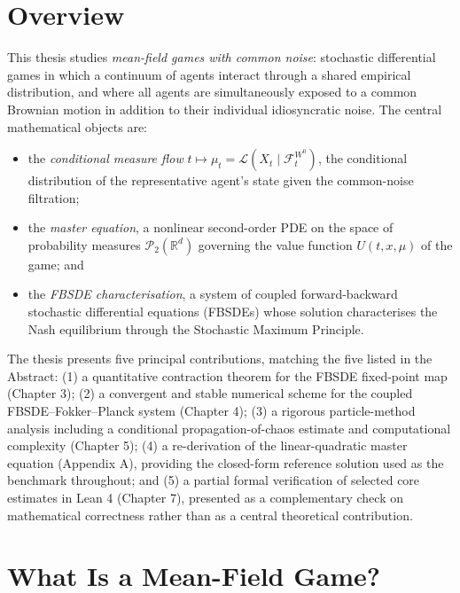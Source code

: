 
\section{Overview}

This thesis studies \emph{mean-field games with common noise}: stochastic
differential games in which a continuum of agents interact through a shared
empirical distribution, and where all agents are simultaneously exposed to a
common Brownian motion in addition to their individual idiosyncratic noise.
The central mathematical objects are:
\begin{itemize}
    \item the \emph{conditional measure flow} $t \mapsto \mu_t = \mathcal{L}(X_t
    \mid \mathcal{F}_t^{W^0})$, the conditional distribution of the representative
    agent's state given the common-noise filtration;
    \item the \emph{master equation}, a nonlinear second-order PDE on the space of
    probability measures $\mathcal{P}_2(\mathbb{R}^d)$ governing the value function
    $U(t, x, \mu)$ of the game; and
    \item the \emph{FBSDE characterisation}, a system of coupled
    forward-backward stochastic differential equations (FBSDEs) whose solution
    characterises the Nash equilibrium through the Stochastic Maximum Principle.
\end{itemize}

The thesis presents five principal contributions, matching the five listed in
the Abstract: (1) a quantitative contraction theorem for the
FBSDE fixed-point map (Chapter 3); (2) a convergent and stable numerical scheme for
the coupled FBSDE--Fokker--Planck system (Chapter 4); (3) a rigorous particle-method
analysis including a conditional propagation-of-chaos estimate and computational
complexity (Chapter 5); (4) a re-derivation of the linear-quadratic master equation
(Appendix A), providing the closed-form reference solution used as the benchmark
throughout; and (5) a partial formal verification of selected core estimates in
Lean 4 (Chapter 7), presented as a complementary check on mathematical correctness
rather than as a central theoretical contribution.

\section{What Is a Mean-Field Game?}

